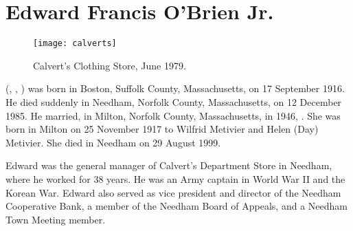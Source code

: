 \section{Edward Francis O'Brien Jr.}\label{per:Edward4OBrien3}

\begin{figure}[htbp]
	\centering
	\texttt{[image: calverts]}
	\caption{Calvert's Clothing Store, June 1979.}
	\label{fig:Calverts}
\end{figure}

 (, , ) was born in Boston, Suffolk County, Massachusetts, on 17 September 1916.\cite{Edward4OBrien3Birth} He died suddenly in Needham, Norfolk County, Massachusetts, on 12 December 1985.\cite{Edward4OBrien3Death} He married, in Milton, Norfolk County, Massachusetts, in 1946, .\cite{Edward4OBrien3Marriage} She was born in Milton on 25 November 1917 to Wilfrid Metivier and Helen (Day) Metivier.\cite{MaryMetivierBirth} She died in Needham on 29 August 1999.\cite{MaryMetivierDeath}

Edward was the general manager of Calvert's Department Store in Needham, where he worked for 38 years. He was an Army captain in World War II and the Korean War. Edward also served as vice president and director of the Needham Cooperative Bank, a member of the Needham Board of Appeals, and a Needham Town Meeting member.\cite{Edward4OBrien3Obit:2}

%
%	
%	
%	

